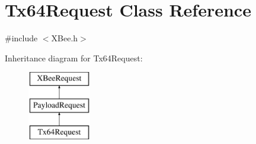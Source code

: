 \hypertarget{classTx64Request}{\section{\-Tx64\-Request \-Class \-Reference}
\label{classTx64Request}
}


{\ttfamily \#include $<$\-X\-Bee.\-h$>$}

\-Inheritance diagram for \-Tx64\-Request\-:\begin{figure}[H]
\begin{center}
\leavevmode
\includegraphics[height=3.000000cm]{classTx64Request}
\end{center}
\end{figure}

